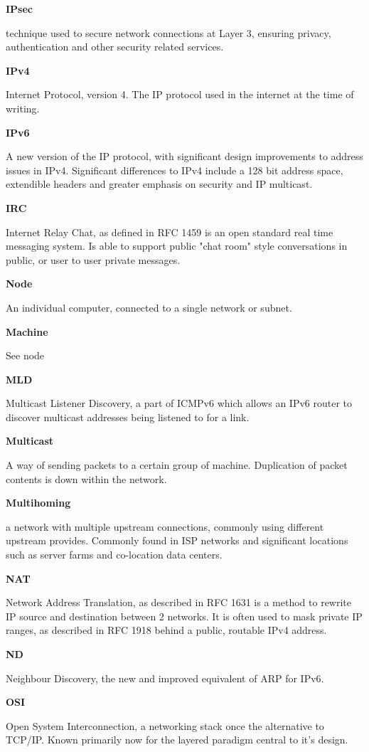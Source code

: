 \textbf{IPsec}

technique used to secure network connections at Layer 3, ensuring
privacy, authentication and other security related services. 

\textbf{IPv4}

Internet Protocol, version 4. The IP protocol used in the internet
at the time of writing.

\textbf{IPv6}

A new version of the IP protocol, with significant design improvements
to address issues in IPv4. Significant differences to IPv4 include a
128 bit address space, extendible headers and greater emphasis on 
security and IP multicast.

\textbf{IRC}

Internet Relay Chat, as defined in RFC 1459 is an open standard real
time messaging system. Is able to support public "chat room" style
conversations in public, or user to user private messages.

\textbf{Node}

An individual computer, connected to a single network or subnet.

\textbf{Machine}

See node

\textbf{MLD}

Multicast Listener Discovery, a part of ICMPv6 which allows an IPv6
router to discover multicast addresses being listened to for a link.

\textbf{Multicast}

A way of sending packets to a certain group of machine. Duplication of
packet contents is down within the network.

\textbf{Multihoming}

a network with multiple upstream connections, commonly using different
upstream provides. Commonly found in ISP networks and significant
locations such as server farms and co-location data centers.

\textbf{NAT}

Network Address Translation, as described in RFC 1631 is a method
to rewrite IP source and destination between 2 networks. It is often
used to mask private IP ranges, as described in RFC 1918 behind a 
public, routable IPv4 address. 

\textbf{ND}

Neighbour Discovery, the new and improved equivalent of ARP for IPv6.

\textbf{OSI}

Open System Interconnection, a networking stack once the alternative to
TCP/IP. Known primarily now for the layered paradigm central to it's
design.

